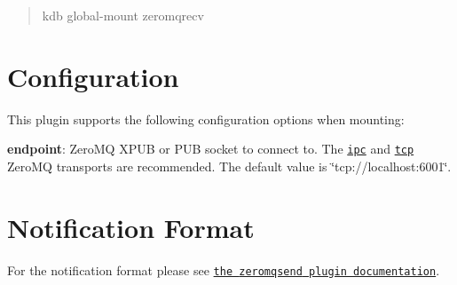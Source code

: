 \begin{quote}
kdb global-\/mount zeromqrecv \end{quote}
\hypertarget{autotoc_md900_autotoc_md904}{}\section{Configuration}\label{autotoc_md900_autotoc_md904}
This plugin supports the following configuration options when mounting\+:


\begin{DoxyItemize}
\item {\bfseries endpoint}\+: Zero\+MQ X\+P\+UB or P\+UB socket to connect to. The \href{http://api.zeromq.org/4-2:zmq-ipc}{\tt {\ttfamily ipc}} and \href{http://api.zeromq.org/4-2:zmq-tcp}{\tt {\ttfamily tcp}} Zero\+MQ transports are recommended. The default value is \char`\"{}tcp\+://localhost\+:6001\char`\"{}.
\end{DoxyItemize}\hypertarget{autotoc_md900_autotoc_md905}{}\section{Notification Format}\label{autotoc_md900_autotoc_md905}
For the notification format please see \href{https://www.libelektra.org/plugins/zeromqsend#notification-format}{\tt the {\ttfamily zeromqsend} plugin documentation}. 